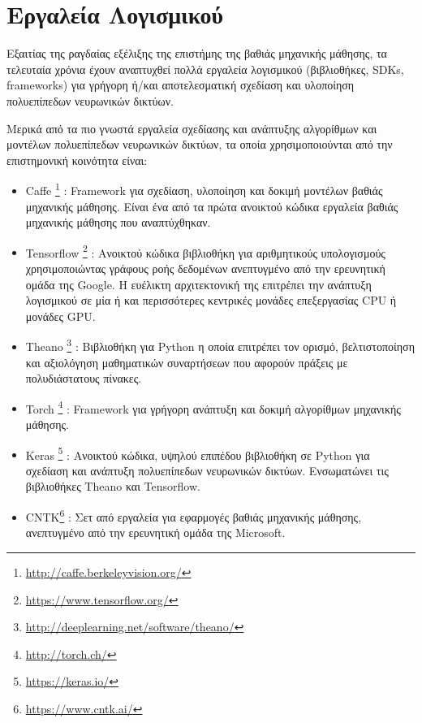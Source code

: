 \section{Εργαλεία Λογισμικού}
\label{sec:dnn_sw}

Εξαιτίας της ραγδαίας εξέλιξης της επιστήμης της βαθιάς μηχανικής μάθησης,
τα τελευταία χρόνια έχουν αναπτυχθεί πολλά εργαλεία λογισμικού (βιβλιοθήκες, SDKs, frameworks)
για γρήγορη ή/και αποτελεσματική σχεδίαση και υλοποίηση πολυεπίπεδων νευρωνικών δικτύων.

Μερικά από τα πιο γνωστά εργαλεία
σχεδίασης και ανάπτυξης αλγορίθμων και μοντέλων πολυεπίπεδων νευρωνικών δικτύων, τα οποία
χρησιμοποιούνται από την επιστημονική κοινότητα είναι:
\begin{itemize}
  \item{Caffe \footnote{\url{http://caffe.berkeleyvision.org/}} %
      \cite{jia2014caffe}:
    Framework για σχεδίαση, υλοποίηση και δοκιμή μοντέλων βαθιάς μηχανικής μάθησης.
    Είναι ένα από τα πρώτα ανοικτού κώδικα εργαλεία βαθιάς μηχανικής μάθησης που αναπτύχθηκαν.}
  \item{Tensorflow \footnote{\url{https://www.tensorflow.org/}} %
      \cite{DBLP:journals/corr/AbadiBCCDDDGIIK16}:
    Ανοικτού κώδικα βιβλιοθήκη για αριθμητικούς υπολογισμούς χρησιμοποιώντας
    γράφους ροής δεδομένων ανεπτυγμένο από την ερευνητική ομάδα της Google.
    Η ευέλικτη αρχιτεκτονική της επιτρέπει την ανάπτυξη
    λογισμικού σε μία ή και περισσότερες κεντρικές μονάδες επεξεργασίας CPU ή μονάδες GPU.}
  \item{Theano \footnote{\url{http://deeplearning.net/software/theano/}}
      \cite{2016arXiv160502688full}\cite{bergstra+al:2010-scipy}\cite{Bastien-Theano-2012}: %
      Βιβλιοθήκη για Python η οποία επιτρέπει τον ορισμό, βελτιστοποίηση και αξιολόγηση
      μαθηματικών συναρτήσεων που αφορούν πράξεις με πολυδιάστατους πίνακες.}
  \item{Torch \footnote{\url{http://torch.ch/}} %
      \cite{collobert2002torch}\cite{collobert2011torch7}\cite{collobert2012implementing}:
    Framework για γρήγορη ανάπτυξη και δοκιμή αλγορίθμων μηχανικής μάθησης.}
  \item{Keras \footnote{\url{https://keras.io/}} \cite{chollet2015keras}:
      Ανοικτού κώδικα, υψηλού επιπέδου βιβλιοθήκη σε Python για σχεδίαση και ανάπτυξη
      πολυεπίπεδων νευρωνικών δικτύων. Ενσωματώνει
      τις βιβλιοθήκες Theano και Tensorflow.} %
  \item{CNTK\footnote{\url{https://www.cntk.ai/}} \cite{Seide:2016:CMO:2939672.2945397}:
    Σετ από εργαλεία για εφαρμογές βαθιάς μηχανικής μάθησης, ανεπτυγμένο από την ερευνητική ομάδα της Microsoft.}
\end{itemize}

